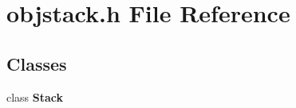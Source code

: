 \section{objstack.\+h File Reference}
\label{objstack_8h}
\subsection*{Classes}
\begin{DoxyCompactItemize}
\item 
class {\bf Stack}
\end{DoxyCompactItemize}
